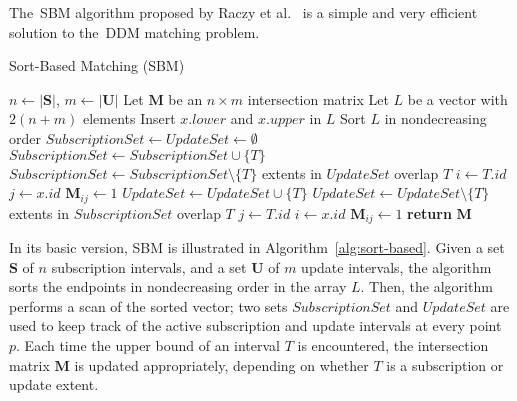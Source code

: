 \documentclass[10pt, conference, compsocconf]{IEEEtran}
\begin{document}
The~\acl{SBM} algorithm proposed by Raczy et al.~\cite{Raczy2005} is a
simple and very efficient solution to the~\ac{DDM} matching
problem. 

\begin{algorithm}[t]
\caption{Sort-Based Matching (SBM)}\label{alg:sort-based}
\begin{algorithmic}
\State $n \gets |\mathbf{S}|$, $m \gets |\mathbf{U}|$
\State Let $\mathbf{M}$ be an $n \times m$ intersection matrix
\State Let $L$ be a vector with $2(n+m)$ elements
\State Insert $x.\textit{lower}$ and $x.\textit{upper}$ in $L$
\EndFor
\State Sort $L$ in nondecreasing order
\State $\textit{SubscriptionSet} \gets \textit{UpdateSet} \gets \emptyset$
\label{alg:sbm-loop}
\State $\textit{SubscriptionSet} \gets \textit{SubscriptionSet} \cup \{T\}$
\Else
\State $\textit{SubscriptionSet} \gets \textit{SubscriptionSet} \setminus \{T\}$
\State\Comment extents in $\textit{UpdateSet}$ overlap $T$
\State $i \gets T.\textit{id}$
\State $j \gets x.\textit{id}$
\State $\mathbf{M}_{ij} \gets 1$
\EndFor
\EndIf
\Else{}
\State $\textit{UpdateSet} \gets \textit{UpdateSet} \cup \{T\}$
\Else
\State $\textit{UpdateSet} \gets \textit{UpdateSet} \setminus \{T\}$
\State\Comment extents in $\textit{SubscriptionSet}$ overlap $T$
\State $j \gets T.\textit{id}$
\State $i \gets x.\textit{id}$
\State $\mathbf{M}_{ij} \gets 1$
\EndFor
\EndIf
\EndIf
\EndFor
\State \textbf{return} $\mathbf{M}$
\EndFunction
\end{algorithmic}
\end{algorithm}

In its basic version, \ac{SBM} is illustrated in
Algorithm~\ref{alg:sort-based}. Given a set $\mathbf{S}$ of $n$
subscription intervals, and a set $\mathbf{U}$ of $m$ update
intervals, the algorithm sorts the endpoints in nondecreasing order in
the array $L$. Then, the algorithm performs a scan of the sorted
vector; two sets $\textit{SubscriptionSet}$ and $\textit{UpdateSet}$
are used to keep track of the active subscription and update intervals
at every point $p$.  Each time the upper bound of an interval $T$ is
encountered, the intersection matrix $\mathbf{M}$ is updated
appropriately, depending on whether $T$ is a subscription or update
extent.
\end{document}
